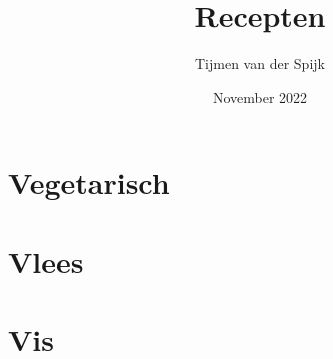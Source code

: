 \documentclass[12pt]{article}
\title{Recepten}
\author{Tijmen van der Spijk}
\date{November 2022}
\begin{document}
\maketitle
\tableofcontents
\pagebreak

\section{Vegetarisch}

\pagebreak

\pagebreak


\section{Vlees}

\pagebreak

\section{Vis}

\pagebreak
\end{document}
